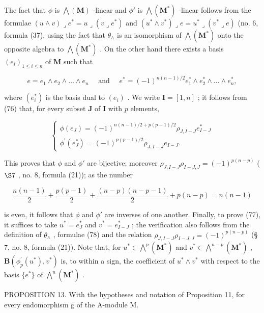The fact that \(\phi\) is \(\bigwedge (\mathbf{M})\) -linear and \(\phi'\) is \(\bigwedge (\mathbf{M}^*)\) -linear follows from the formulae \((u \wedge v) \lrcorner e^* = u \lrcorner (v \lrcorner e^*)\) and \((u^* \wedge v^*) \lrcorner e = u^* \lrcorner (v^* \lrcorner e)\) (no. 6, formula (37), using the fact that \(\theta_{\wedge}\) is an isomorphism of \(\bigwedge (\mathbf{M}^*)\) onto the opposite algebra to \(\bigwedge (\mathbf{M}^*)\) . On the other hand there exists a basis \((e_i)_{1 \leq i \leq n}\) of \(\mathbf{M}\) such that

\[
e = e _ {1} \wedge e _ {2} \wedge \dots \wedge e _ {n} \quad \text { and } \quad e ^ {*} = (- 1) ^ {n (n - 1) / 2} e _ {1} ^ {*} \wedge e _ {2} ^ {*} \wedge \dots \wedge e _ {n} ^ {*},
\]

where \((e_i^*)\) is the basis dual to \((e_i)\) . We write \(\mathbf{I} = [1, n]\) ; it follows from (76) that, for every subset \(\mathbf{J}\) of \(\mathbf{I}\) with \(p\) elements,

\[
\left\{ \begin{array}{l} \phi (e _ {J}) = (- 1) ^ {n (n - 1) / 2 + p (p - 1) / 2} \rho_ {J, I - J} e _ {I - J} ^ {*} \\ \phi^ {\prime} (e _ {J} ^ {*}) = (- 1) ^ {p (p - 1) / 2} \rho_ {J, I - J} e _ {I - J}. \end{array} \right.\tag{78}
\]

This proves that \(\phi\) and \(\phi'\) are bijective; moreover \(\rho_{J,I-J}\rho_{I-J,J}=(-1)^{p(n-p)}\) ( \(\S 7\) , no. 8, formula (21)); as the number

\[
\frac {n (n - 1)}{2} + \frac {p (p - 1)}{2} + \frac {(n - p) (n - p - 1)}{2} + p (n - p) = n (n - 1)
\]

is even, it follows that \(\phi\) and \(\phi'\) are inverses of one another. Finally, to prove (77), it suffices to take \(u^{*} = e_{J}^{*}\) and \(v^{*} = e_{I - J}^{*}\) ; the verification also follows from the definition of \(\theta_{\wedge}\) , formulae (78) and the relation \(\rho_{J,I - J}\rho_{I - J,J} = (-1)^{p(n - p)}\) (§ 7, no. 8, formula (21)). Note that, for \(u^{*}\in \bigwedge^{p}(\mathbf{M}^{*})\) and \(v^{*}\in \bigwedge^{n - p}(\mathbf{M}^{*})\) , \(\mathbf{B}(\phi_{p}^{\prime}(u^{*}), v^{*})\) is, to within a sign, the coefficient of \(u^{*} \wedge v^{*}\) with respect to the basis \(\{e^{*}\}\) of \(\bigwedge^{n}(\mathbf{M}^{*})\) .

PROPOSITION 13. With the hypotheses and notation of Proposition 11, for every endomorphism g of the A-module M.

